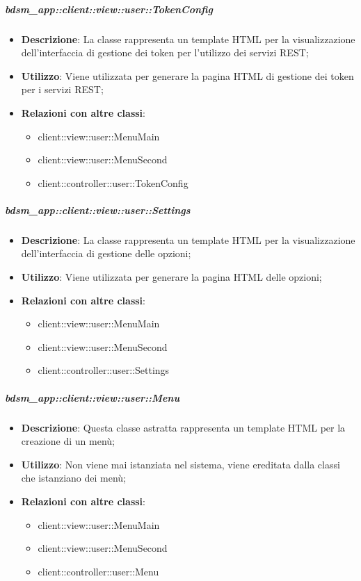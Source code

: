 		\subparagraph{bdsm\_app::client::view::user::TokenConfig} %
		\label{subp:bdsm_app_client_view_user_tokenconfig}
			\begin{itemize}
				\item \textbf{Descrizione}: La classe rappresenta un template HTML per la visualizzazione dell'interfaccia di gestione dei token per l'utilizzo dei servizi REST;
				\item \textbf{Utilizzo}: Viene utilizzata per generare la pagina HTML di gestione dei token per i servizi REST;
				\item \textbf{Relazioni con altre classi}: 		
					\begin{itemize}
						\item client::view::user::MenuMain
						\item client::view::user::MenuSecond
						\item client::controller::user::TokenConfig					
					\end{itemize}
			\end{itemize}

		\subparagraph{bdsm\_app::client::view::user::Settings} %
		\label{subp:bdsm_app_client_view_user_settings}
			\begin{itemize}
				\item \textbf{Descrizione}: La classe rappresenta un template HTML per la visualizzazione dell'interfaccia di gestione delle opzioni;
				\item \textbf{Utilizzo}: Viene utilizzata per generare la pagina HTML delle opzioni;
				\item \textbf{Relazioni con altre classi}: 		
					\begin{itemize}
						\item client::view::user::MenuMain
						\item client::view::user::MenuSecond
						\item client::controller::user::Settings
					\end{itemize}
			\end{itemize}

		\subparagraph{bdsm\_app::client::view::user::Menu} %
		\label{subp:bdsm_app_client_view_user_menu}
			\begin{itemize}
				\item \textbf{Descrizione}: Questa classe astratta rappresenta un template HTML per la creazione di un menù;
				\item \textbf{Utilizzo}: Non viene mai istanziata nel sistema, viene ereditata dalla classi che istanziano dei menù;
				\item \textbf{Relazioni con altre classi}: 		
					\begin{itemize}
						\item client::view::user::MenuMain
						\item client::view::user::MenuSecond
						\item client::controller::user::Menu							
					\end{itemize}
			\end{itemize}

